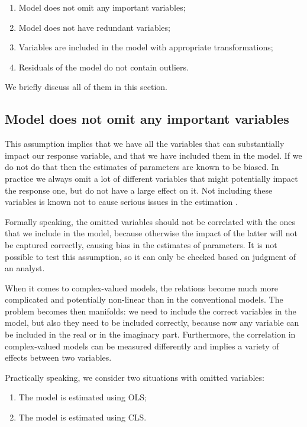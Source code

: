 \documentclass[
]{book}
\providecommand{\tightlist}{%
  \setlength{\itemsep}{0pt}\setlength{\parskip}{0pt}}
\begin{document}
\begin{enumerate}
\def\labelenumi{\arabic{enumi}.}
\tightlist
\item
  Model does not omit any important variables;
\item
  Model does not have redundant variables;
\item
  Variables are included in the model with appropriate transformations;
\item
  Residuals of the model do not contain outliers.
\end{enumerate}

We briefly discuss all of them in this section.

\hypertarget{assumptionsSpecificationOmit}{%
\subsection{Model does not omit any important variables}\label{assumptionsSpecificationOmit}}

This assumption implies that we have all the variables that can substantially impact our response variable, and that we have included them in the model. If we do not do that then the estimates of parameters are known to be biased. In practice we always omit a lot of different variables that might potentially impact the response one, but do not have a large effect on it. Not including these variables is known not to cause serious issues in the estimation \citep{econometrics}.

Formally speaking, the omitted variables should not be correlated with the ones that we include in the model, because otherwise the impact of the latter will not be captured correctly, causing bias in the estimates of parameters. It is not possible to test this assumption, so it can only be checked based on judgment of an analyst.

When it comes to complex-valued models, the relations become much more complicated and potentially non-linear than in the conventional models. The problem becomes then manifolds: we need to include the correct variables in the model, but also they need to be included correctly, because now any variable can be included in the real or in the imaginary part. Furthermore, the correlation in complex-valued models can be measured differently and implies a variety of effects between two variables.

Practically speaking, we consider two situations with omitted variables:

\begin{enumerate}
\def\labelenumi{\arabic{enumi}.}
\tightlist
\item
  The model is estimated using OLS;
\item
  The model is estimated using CLS.
\end{enumerate}
\end{document}
